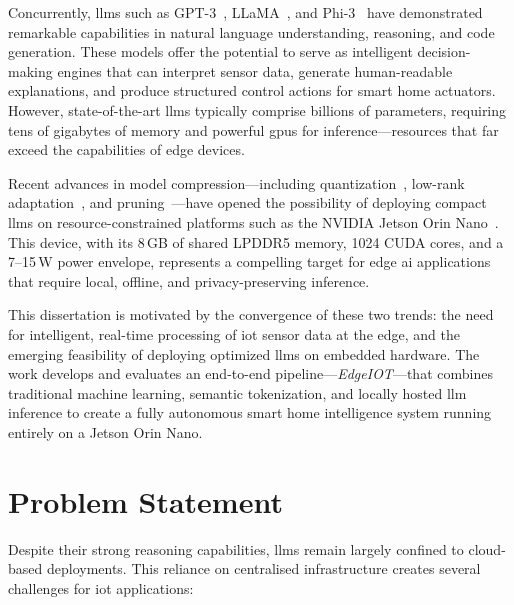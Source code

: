 \documentclass[12pt,a4paper,oneside]{report}
\begin{document}
Concurrently, \glspl{llm} such as GPT-3~\cite{brown2020language}, LLaMA~\cite{touvron2023llama,touvron2023llama2}, and Phi-3~\cite{abdin2024phi3} have demonstrated remarkable capabilities in natural language understanding, reasoning, and code generation. These models offer the potential to serve as intelligent decision-making engines that can interpret sensor data, generate human-readable explanations, and produce structured control actions for smart home actuators. However, state-of-the-art \glspl{llm} typically comprise billions of parameters, requiring tens of gigabytes of memory and powerful \glspl{gpu} for inference---resources that far exceed the capabilities of edge devices.

Recent advances in model compression---including quantization~\cite{dettmers2022gpt3,frantar2023gptq}, low-rank adaptation~\cite{hu2022lora,dettmers2023qlora}, and pruning~\cite{frantar2023sparsegpt}---have opened the possibility of deploying compact \glspl{llm} on resource-constrained platforms such as the NVIDIA Jetson Orin Nano~\cite{nvidia2024jetson}. This device, with its 8\,GB of shared LPDDR5 memory, 1024 CUDA cores, and a 7--15\,W power envelope, represents a compelling target for edge \gls{ai} applications that require local, offline, and privacy-preserving inference.

This dissertation is motivated by the convergence of these two trends: the need for intelligent, real-time processing of \gls{iot} sensor data at the edge, and the emerging feasibility of deploying optimized \glspl{llm} on embedded hardware. The work develops and evaluates an end-to-end pipeline---\textit{EdgeIOT}---that combines traditional machine learning, semantic tokenization, and locally hosted \gls{llm} inference to create a fully autonomous smart home intelligence system running entirely on a Jetson Orin Nano.


\section{Problem Statement}
\label{sec:intro-problem}

Despite their strong reasoning capabilities, \glspl{llm} remain largely confined to cloud-based deployments. This reliance on centralised infrastructure creates several challenges for \gls{iot} applications:
\end{document}

